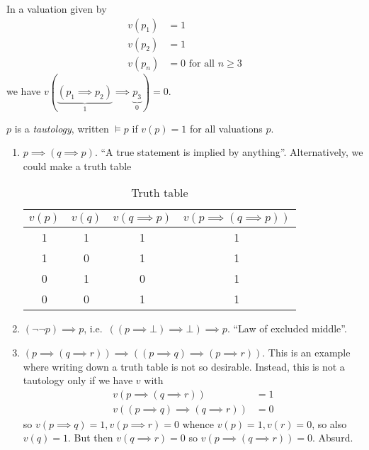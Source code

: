 \documentclass[a4paper]{article}
\begin{document}
\begin{eg}
  In a valuation given by
  \begin{align*}
    v(p_1) &= 1 \\
    v(p_2) &= 1 \\
    v(p_n) &= 0 \text{ for all } n \geq 3
  \end{align*}
  we have \(v(\underbrace{(p_1 \implies p_2)}_{1} \implies \underbrace{p_3}_{0}) = 0\).
\end{eg}

\begin{definition}[Tautology]
  \(p\) is a \emph{tautology}, written \(\models p\) if \(v(p) = 1\) for all valuations \(p\).
\end{definition}

\begin{eg}\leavevmode
  \begin{enumerate}
  \item \(p \implies (q \implies p)\). ``A true statement is implied by anything''. Alternatively, we could make a truth table
    \begin{table}[h]
      \centering
      \begin{tabular}{c|c|c|c}
        \(v(p)\) & \(v(q)\) & \(v(q \implies p)\) & \(v(p \implies (q \implies p))\) \\\hline
        1 & 1 & 1 & 1 \\
        1 & 0 & 1 & 1 \\
        0 & 1 & 0 & 1 \\
        0 & 0 & 1 & 1
      \end{tabular}
      \caption{Truth table}
    \end{table}
  \item \((\neg \neg p) \implies p\), i.e.\ \(((p \implies \bot) \implies \bot) \implies p\). ``Law of excluded middle''.
  \item \((p \implies (q \implies r)) \implies ((p \implies q) \implies (p \implies r))\). This is an example where writing down a truth table is not so desirable. Instead, this is not a tautology only if we have \(v\) with
    \begin{align*}
      v(p \implies (q\implies r)) &= 1 \\
      v((p \implies q) \implies (q \implies r)) &= 0
    \end{align*}
    so \(v(p \implies q) = 1, v(p \implies r) = 0\) whence \(v(p) = 1, v(r) = 0\), so also \(v(q) = 1\). But then \(v(q \implies r) = 0\) so \(v(p \implies (q \implies r)) = 0\). Absurd.
  \end{enumerate}
\end{eg}
\end{document}
